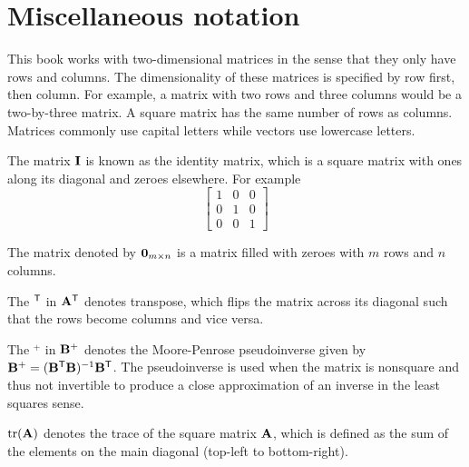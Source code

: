 \section{Miscellaneous notation}

This book works with two-dimensional matrices in the sense that they only have
rows and columns. The dimensionality of these matrices is specified by row
first, then column. For example, a matrix with two rows and three columns would
be a two-by-three matrix. A square matrix has the same number of rows as
columns. Matrices commonly use capital letters while vectors use lowercase
letters.

The matrix $\mathbf{I}$ is known as the identity matrix, which is a square matrix
with ones along its diagonal and zeroes elsewhere. For example
\begin{equation*}
  \begin{bmatrix}
    1 & 0 & 0 \\
    0 & 1 & 0 \\
    0 & 0 & 1
  \end{bmatrix}
\end{equation*}

The matrix denoted by $\mathbf{0}_{m \times n}$ is a matrix filled with zeroes with
$m$ rows and $n$ columns.

The $^\mathsf{T}$ in $\mathbf{A}^\mathsf{T}$ denotes transpose, which flips the matrix across its
diagonal such that the rows become columns and vice versa.

The $^+$ in $\mathbf{B}^+$ denotes the Moore-Penrose pseudoinverse given by
$\mathbf{B}^+ = (\mathbf{B}^\mathsf{T}\mathbf{B})^{-1}\mathbf{B}^\mathsf{T}$. The pseudoinverse is used when
the matrix is nonsquare and thus not invertible to produce a close approximation
of an inverse in the least squares sense.

$\operatorname{tr}(\mathbf{A})$ denotes the trace of the square matrix $\mathbf{A}$, which is
defined as the sum of the elements on the main diagonal (top-left to
bottom-right).

